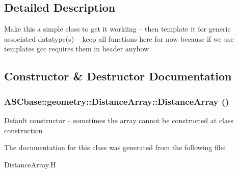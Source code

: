 \subsection{Detailed Description}
Make this a simple class to get it workiing -- then template it for generic associated datatype(s) -- keep all functions here for now because if we use templates gcc requires them in header anyhow 



\subsection{Constructor \& Destructor Documentation}
\subsubsection{\setlength{\rightskip}{0pt plus 5cm}ASCbase::geometry::Distance\-Array::Distance\-Array ()\hspace{0.3cm}{\tt  [inline]}}\label{classASCbase_1_1geometry_1_1DistanceArray_2c29de984a15b6bd3269988d1296667b}


Default constructor -- sometimes the array cannot be constructed at class construction 

The documentation for this class was generated from the following file:\begin{CompactItemize}
\item 
Distance\-Array.H\end{CompactItemize}
